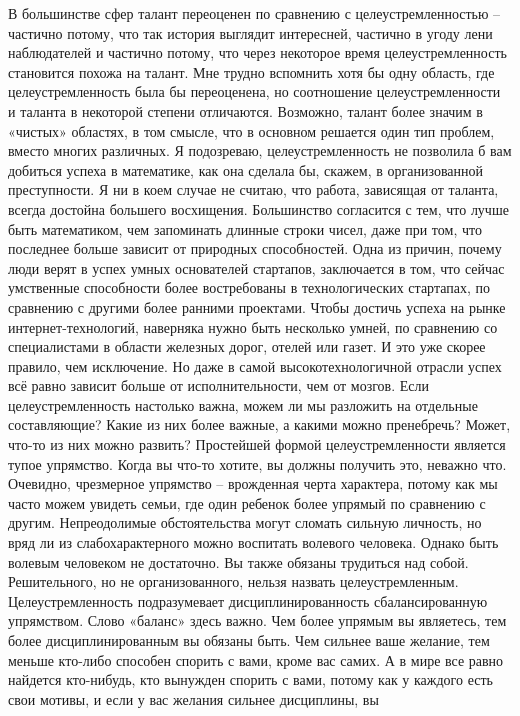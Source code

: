 \documentclass[ebook,12pt,oneside,openany]{memoir}
\begin{document}
В большинстве сфер талант переоценен по сравнению с
целеустремленностью – частично потому, что так история выглядит
интересней, частично в угоду лени наблюдателей и частично потому, что
через некоторое время целеустремленность становится похожа на талант.
Мне трудно вспомнить хотя бы одну область, где целеустремленность была
бы переоценена, но соотношение целеустремленности и таланта в
некоторой степени отличаются. Возможно, талант более значим в «чистых»
областях, в том смысле, что в основном решается один тип проблем,
вместо многих различных. Я подозреваю, целеустремленность не позволила
б вам добиться успеха в математике, как она сделала бы, скажем, в
организованной преступности. Я ни в коем случае не считаю, что работа,
зависящая от таланта, всегда достойна большего восхищения. Большинство
согласится с тем, что лучше быть математиком, чем запоминать длинные
строки чисел, даже при том, что последнее больше зависит от природных
способностей. Одна из причин, почему люди верят в успех умных
основателей стартапов, заключается в том, что сейчас умственные
способности более востребованы в технологических стартапах, по
сравнению с другими более ранними проектами. Чтобы достичь успеха на
рынке интернет-технологий, наверняка нужно быть несколько умней, по
сравнению со специалистами в области железных дорог, отелей или газет.
И это уже скорее правило, чем исключение. Но даже в самой
высокотехнологичной отрасли успех всё равно зависит больше от
исполнительности, чем от мозгов. Если целеустремленность настолько
важна, можем ли мы разложить на отдельные составляющие? Какие из них
более важные, а какими можно пренебречь? Может, что-то из них можно
развить? Простейшей формой целеустремленности является тупое
упрямство. Когда вы что-то хотите, вы должны получить это, неважно
что. Очевидно, чрезмерное упрямство – врожденная черта характера,
потому как мы часто можем увидеть семьи, где один ребенок более
упрямый по сравнению с другим. Непреодолимые обстоятельства могут
сломать сильную личность, но вряд ли из слабохарактерного можно
воспитать волевого человека. Однако быть волевым человеком не
достаточно. Вы также обязаны трудиться над собой. Решительного, но не
организованного, нельзя назвать целеустремленным. Целеустремленность
подразумевает дисциплинированность сбалансированную упрямством. Слово
«баланс» здесь важно. Чем более упрямым вы являетесь, тем более
дисциплинированным вы обязаны быть. Чем сильнее ваше желание, тем
меньше кто-либо способен спорить с вами, кроме вас самих. А в мире все
равно найдется кто-нибудь, кто вынужден спорить с вами, потому как у
каждого есть свои мотивы, и если у вас желания сильнее дисциплины, вы
\end{document}
